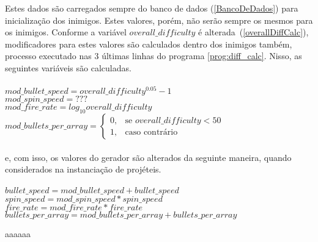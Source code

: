 Estes dados são carregados sempre do banco de dados (\ref{BancoDeDados}) para inicialização dos inimigos. Estes valores, porém, não serão sempre os mesmos para os inimigos. Conforme a variável $overall\_difficulty$ é alterada~(\ref{overallDiffCalc}), modificadores para estes valores são calculados dentro dos inimigos também, processo executado nas 3 últimas linhas do programa \ref{prog:diff_calc}. Nisso, as seguintes variáveis são calculadas.\\
\\
$mod\_bullet\_speed = overall\_difficulty^{0.05} - 1$\\
$mod\_spin\_speed = ???$\\
$mod\_fire\_rate = log_{10} overall\_difficulty$\\
$mod\_bullets\_per\_array =  \begin{cases}
                                0,& \text{se } overall\_difficulty< 50\\
                                1,              & \text{caso contrário}
                            \end{cases}$\\
\\
e, com isso, os valores do gerador são alterados da seguinte maneira, quando considerados na instanciação de projéteis.\\
\\
$bullet\_speed = mod\_bullet\_speed + bullet\_speed$\\
$spin\_speed = mod\_spin\_speed * spin\_speed$\\
$fire\_rate = mod\_fire\_rate * fire\_rate$\\
$bullets\_per\_array = mod\_bullets\_per\_array + bullets\_per\_array$

aaaaaa


